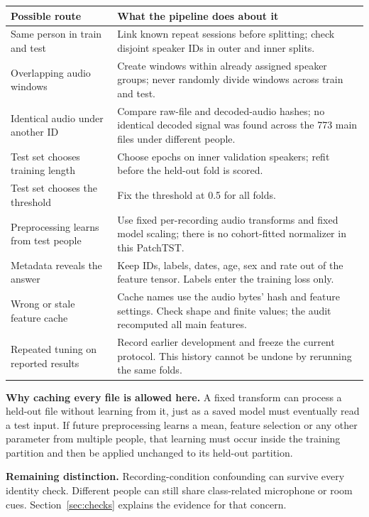 \documentclass[11pt,a4paper]{article}
\newcommand{\key}[1]{\textbf{#1}}
\begin{document}
\begin{center}\small
\begin{tabularx}{\linewidth}{@{}L{3.4cm}Y@{}}
\toprule
Possible route & What the pipeline does about it\\
\midrule
Same person in train and test & Link known repeat sessions before splitting;
check disjoint speaker IDs in outer and inner splits.\\
Overlapping audio windows & Create windows within already assigned speaker groups;
never randomly divide windows across train and test.\\
Identical audio under another ID & Compare raw-file and decoded-audio hashes;
no identical decoded signal was found across the 773 main files under different people.\\
Test set chooses training length & Choose epochs on inner validation speakers;
refit before the held-out fold is scored.\\
Test set chooses the threshold & Fix the threshold at 0.5 for all folds.\\
Preprocessing learns from test people & Use fixed per-recording audio transforms
and fixed model scaling; there is no cohort-fitted normalizer in this PatchTST.\\
Metadata reveals the answer & Keep IDs, labels, dates, age, sex and rate out of
the feature tensor. Labels enter the training loss only.\\
Wrong or stale feature cache & Cache names use the audio bytes' hash and feature
settings. Check shape and finite values; the audit recomputed all main features.\\
Repeated tuning on reported results & Record earlier development and freeze the
current protocol. This history cannot be undone by rerunning the same folds.\\
\bottomrule
\end{tabularx}
\end{center}

\key{Why caching every file is allowed here.} A fixed transform can process a
held-out file without learning from it, just as a saved model must eventually
read a test input. If future preprocessing learns a mean, feature selection or
any other parameter from multiple people, that learning must occur inside the
training partition and then be applied unchanged to its held-out partition.

\key{Remaining distinction.} Recording-condition confounding can survive every
identity check. Different people can still share class-related microphone or
room cues. Section~\ref{sec:checks} explains the evidence for that concern.
\end{document}
